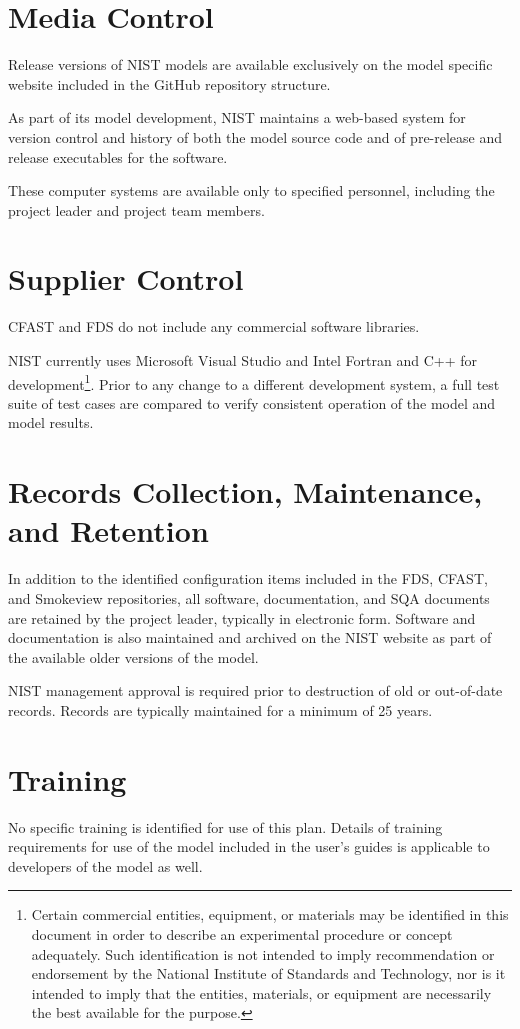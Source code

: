 \documentclass[11pt]{book}
\begin{document}
\section{Media Control}

Release versions of NIST models are available exclusively on the model specific website included in the GitHub repository structure.

As part of its model development, NIST maintains a web-based system for version control and history of both the model source code and of pre-release and release executables for the software.

These computer systems are available only to specified personnel, including the project leader and project team members.

\section{Supplier Control}

CFAST and FDS do not include any commercial software libraries.

NIST currently uses Microsoft Visual Studio and Intel Fortran and C++ for development\footnote{Certain commercial entities, equipment, or materials may be identified in this document in order to describe an experimental procedure or concept adequately. Such identification is not intended to imply recommendation or endorsement by the National Institute of Standards and Technology, nor is it intended to imply that the entities, materials, or equipment are necessarily the best available for the purpose.}.  Prior to any change to a different development system, a full test suite of test cases are compared to verify consistent operation of the model and model results.

\section{Records Collection, Maintenance, and Retention}

In addition to the identified configuration items included in the FDS, CFAST, and Smokeview repositories, all software, documentation, and SQA documents are retained by the project leader, typically in electronic form. Software and documentation is also maintained and archived on the NIST website as part of the available older versions of the model.

NIST management approval is required prior to destruction of old or out-of-date records. Records are typically maintained for a minimum of 25 years.

\section{Training}

No specific training is identified for use of this plan.  Details of training requirements for use of the model included in the user's guides is applicable to developers of the model as well.



\backmatter
\nopart



\printindex
\end{document}
